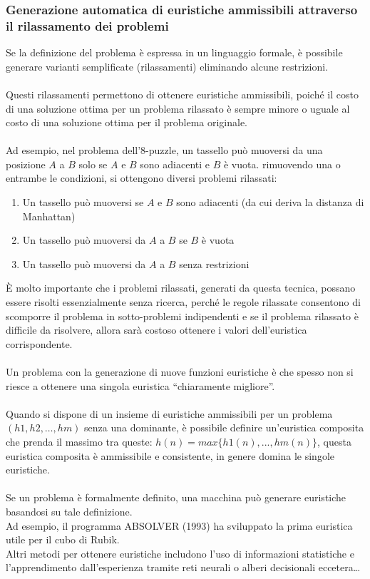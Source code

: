 \documentclass[../main.tex]{subfiles}
\begin{document}
	\subsubsection{Generazione automatica di euristiche ammissibili attraverso il rilassamento dei problemi}
	Se la definizione del problema è espressa in un linguaggio formale, è possibile generare varianti semplificate (rilassamenti) eliminando alcune restrizioni.\\ \\
	Questi rilassamenti permettono di ottenere euristiche ammissibili, poiché il costo di una soluzione ottima per un problema rilassato è sempre minore o uguale al costo di una soluzione ottima per il problema originale.\\ \\
	Ad esempio, nel problema dell'8-puzzle, un tassello può muoversi da una posizione $A$ a $B$ solo se $A$ e $B$ sono adiacenti e $B$ è vuota. rimuovendo una o entrambe le condizioni, si ottengono diversi problemi rilassati:
	\begin{enumerate}
		\item Un tassello può muoversi se $A$ e $B$ sono adiacenti (da cui deriva la distanza di Manhattan)
		\item Un tassello può muoversi da $A$ a $B$ se $B$ è vuota
		\item Un tassello può muoversi da $A$ a $B$ senza restrizioni
	\end{enumerate}
	È molto importante che i problemi rilassati, generati da questa tecnica, possano essere risolti essenzialmente senza ricerca, perché le regole rilassate consentono di scomporre il problema in sotto-problemi indipendenti e se il problema rilassato è difficile da risolvere, allora sarà costoso ottenere i valori dell'euristica corrispondente.\\ \\
	Un problema con la generazione di nuove funzioni euristiche è che spesso non si riesce a ottenere una singola euristica “chiaramente migliore”.\\ \\
	Quando si dispone di un insieme di euristiche ammissibili per un problema $(h1,h2, \dots, hm)$ senza una dominante, è possibile definire un’euristica composita che prenda il massimo tra queste: $h(n) = max\{h1(n), ..., hm(n)\}$, questa euristica composita è ammissibile e consistente, in genere domina le singole euristiche.\\ \\
	Se un problema è formalmente definito, una macchina può generare euristiche basandosi su tale definizione. \\
	Ad esempio, il programma ABSOLVER (1993) ha sviluppato la prima euristica utile per il cubo di Rubik. \\
	Altri metodi per ottenere euristiche includono l'uso di informazioni statistiche e l'apprendimento dall'esperienza tramite reti neurali o alberi decisionali eccetera…
\end{document}
